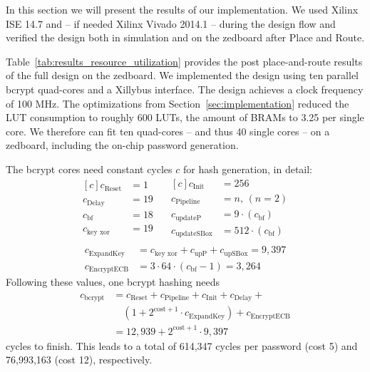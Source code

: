 In this section we will present the results of our implementation. We used
Xilinx ISE 14.7 and -- if needed Xilinx Vivado 2014.1 -- during the design flow
and verified the design both in simulation and on the zedboard after Place and
Route.

Table~\ref{tab:results_resource_utilization} provides the post place-and-route
results of the full design on the zedboard. We implemented the design using ten
parallel bcrypt quad-cores and a Xillybus interface. The design achieves a clock
frequency of 100 MHz. The optimizations from Section~\ref{sec:implementation}
reduced the LUT consumption to roughly 600 LUTs, the amount of BRAMs to 3.25
per single core. We therefore can fit ten quad-cores -- and thus 40 single cores
-- on a zedboard, including the on-chip password generation.

The bcrypt cores need constant cycles $c$ for hash generation, in detail:
\begin{equation*}
\begin{aligned}[c]
c_\text{Reset} &= 1\\
c_\text{Delay} &= 19\\
c_\text{bf} &= 18\\
c_\text{key xor} &= 19\\
\end{aligned}
\quad
\begin{aligned}[c]
c_\text{Init} &= 256\\
c_\text{Pipeline} &= n,\, (n = 2)\\
c_\text{updateP} &= 9 \cdot (c_\text{bf})\\
c_\text{updateSBox} &= 512 \cdot (c_\text{bf})\\
\end{aligned}
\end{equation*}
\begin{align*}
c_\text{ExpandKey} &= c_\text{key xor} + c_\text{upP} + c_\text{upSBox} = 9,397\\
c_\text{EncryptECB} &= 3 \cdot 64 \cdot (c_\text{bf} - 1) = 3,264
\end{align*}
Following these values, one bcrypt hashing needs
\begin{align*}
c_\text{bcrypt} &= c_\text{Reset} + c_\text{Pipeline} + c_\text{Init} +
				   c_\text{Delay} +\\
				&\quad (1 + 2^{\text{cost}+1} \cdot c_\text{ExpandKey}) +
				   c_\text{EncryptECB}\\
				&= 12,939 + 2^{\text{cost}+1} \cdot 9,397
\end{align*}
cycles to finish. This leads to a total of 614,347 cycles per password (cost
5) and 76,993,163 (cost 12), respectively.

